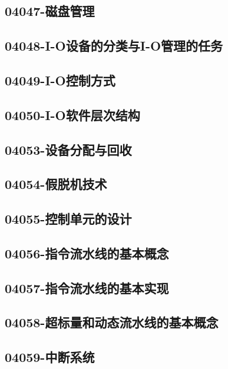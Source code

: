 \subsection{04047-磁盘管理}

\subsection{04048-I-O设备的分类与I-O管理的任务}

\subsection{04049-I-O控制方式}

\subsection{04050-I-O软件层次结构}

\subsection{04053-设备分配与回收}

\subsection{04054-假脱机技术}

\subsection{04055-控制单元的设计}

\subsection{04056-指令流水线的基本概念}

\subsection{04057-指令流水线的基本实现}

\subsection{04058-超标量和动态流水线的基本概念}

\subsection{04059-中断系统}

